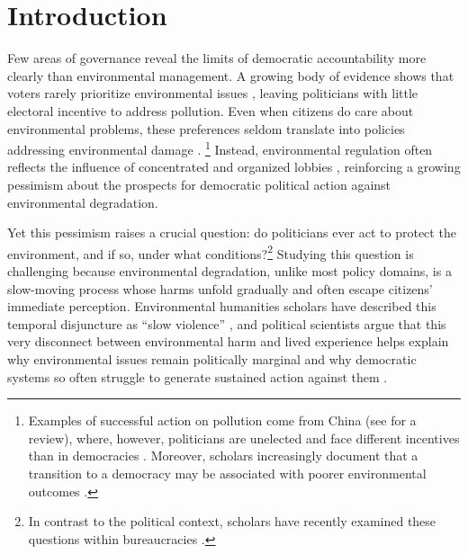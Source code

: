 \documentclass[12pt]{article}
\begin{document}
\clearpage
\section{Introduction}


Few areas of governance reveal the limits of democratic accountability more clearly than environmental management. A growing body of evidence shows that voters rarely prioritize environmental issues \citep{singh_thachil_2023_airpollution}, leaving politicians with little electoral incentive to address pollution. Even when citizens do care about environmental problems, these preferences seldom translate into policies addressing environmental damage \citep{dechezlepretre2025fighting, hsiao2025climate}.%
\footnote{Examples of successful action on pollution come from China (see \citet{bar_gulzar2025} for a review), where, however, politicians are unelected and face different incentives than in democracies \citep{buntaine2024does}. Moreover, scholars increasingly document that a transition to a democracy may be associated with poorer environmental outcomes \citep{sanford2023democratization, chesler2023democracy}.} Instead, environmental regulation often reflects the influence of concentrated and organized lobbies \citep{mcalexander2020elections, stokes2020short, harding2024buying, gonzalez2024money}, reinforcing a growing pessimism about the prospects for democratic political action against environmental degradation. 

Yet this pessimism raises a crucial question: do politicians ever act to protect the environment, and if so, under what conditions?\footnote{In contrast to the political context, scholars have recently examined these questions within bureaucracies \citep{dipoppa2024bureaucrat, buntaine2024does}.} Studying this question is challenging because environmental degradation, unlike most policy domains, is a slow-moving process whose harms unfold gradually and often escape citizens’ immediate perception. Environmental humanities scholars have described this temporal disjuncture as ``slow violence'' \citep{Nixon2013}, and political scientists argue that this very disconnect between environmental harm and lived experience helps explain why environmental issues remain politically marginal and why democratic systems so often struggle to generate sustained action against them \citep{grossman2026politics}.
\end{document}
